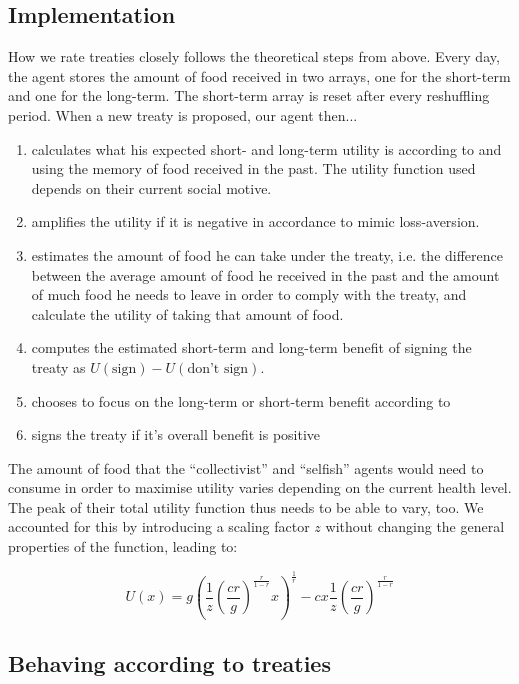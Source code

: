 \subsection{Implementation}

How we rate treaties closely follows the theoretical steps from above. Every day, the agent stores the amount of food received in two arrays, one for the short-term and one for the long-term. The short-term array is reset after every reshuffling period. When a new treaty is proposed, our agent then...

\begin{enumerate}
    \item calculates what his expected short- and long-term utility is according to  and using the memory of food received in the past. The utility function used depends on their current social motive.
    \item amplifies the utility if it is negative in accordance to mimic loss-aversion.
    \item estimates the amount of food he can take under the treaty, i.e. the difference between the average amount of food he received in the past and the amount of much food he needs to leave in order to comply with the treaty, and calculate the utility of taking that amount of food.
    \item computes the estimated short-term and long-term benefit of signing the treaty as $U(\text{sign}) - U(\text{don’t sign})$.
    \item chooses to focus on the long-term or short-term benefit according to 
    \item signs the treaty if it’s overall benefit is positive
\end{enumerate}

The amount of food that the “collectivist” and “selfish” agents would need to consume in order to maximise utility varies depending on the current health level. The peak of their total utility function thus needs to be able to vary, too. We accounted for this by introducing a scaling factor $z$ without changing the general properties of the function, leading to:

\begin{equation}
U\left(x\right)=g\left(\frac{1}{z}\left(\frac{cr}{g}\right)^{\frac{r}{1-r}}x\right)^{\frac{1}{r}}-cx\frac{1}{z}\left(\frac{cr}{g}\right)^{\frac{r}{1-r}}    
\end{equation}
\subsection{Behaving according to treaties}

